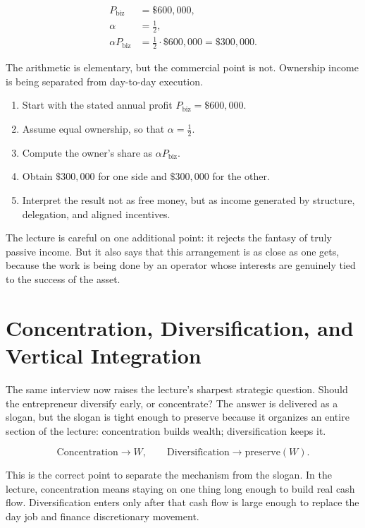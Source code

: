 \begin{align}
P_{\mathrm{biz}} &= \$600{,}000,\\
\alpha &= \tfrac12,\\
\alpha P_{\mathrm{biz}} &= \tfrac12 \cdot \$600{,}000 = \$300{,}000.
\end{align}

The arithmetic is elementary, but the commercial point is not. Ownership income is being separated from day-to-day execution.

\begin{enumerate}
\item Start with the stated annual profit \(P_{\mathrm{biz}}=\$600{,}000\).
\item Assume equal ownership, so that \(\alpha=\tfrac12\).
\item Compute the owner's share as \(\alpha P_{\mathrm{biz}}\).
\item Obtain \(\$300{,}000\) for one side and \(\$300{,}000\) for the other.
\item Interpret the result not as free money, but as income generated by structure, delegation, and aligned incentives.
\end{enumerate}

The lecture is careful on one additional point: it rejects the fantasy of truly passive income. But it also says that this arrangement is as close as one gets, because the work is being done by an operator whose interests are genuinely tied to the success of the asset.

\section{Concentration, Diversification, and Vertical Integration}

The same interview now raises the lecture's sharpest strategic question. Should the entrepreneur diversify early, or concentrate? The answer is delivered as a slogan, but the slogan is tight enough to preserve because it organizes an entire section of the lecture: concentration builds wealth; diversification keeps it.

\begin{equation}
\mathrm{Concentration} \longrightarrow W,
\qquad
\mathrm{Diversification} \longrightarrow \mathrm{preserve}(W).
\end{equation}

This is the correct point to separate the mechanism from the slogan. In the lecture, concentration means staying on one thing long enough to build real cash flow. Diversification enters only after that cash flow is large enough to replace the day job and finance discretionary movement.

